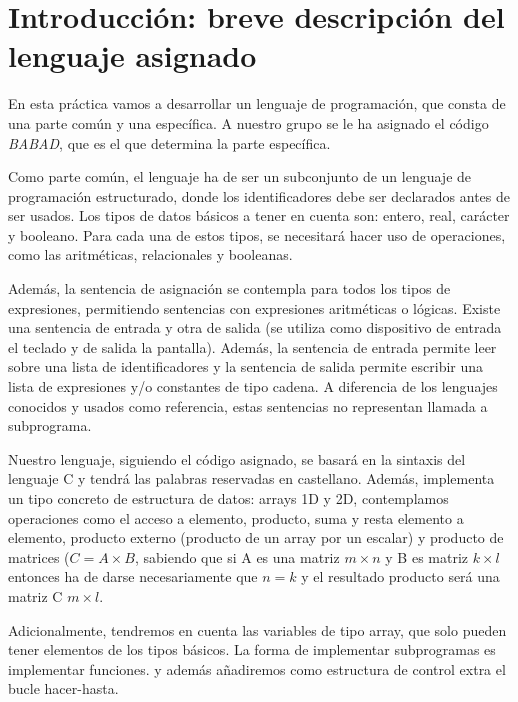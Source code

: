 \section{Introducción: breve descripción del lenguaje asignado}

En esta práctica vamos a desarrollar un lenguaje de programación,
que consta de una parte común y una específica. A nuestro grupo se le ha
asignado el código \emph{BABAD}, que es el que determina la parte específica.

Como parte común, el lenguaje ha de ser un subconjunto de un lenguaje de
programación estructurado, donde los identificadores debe ser declarados antes
de ser usados. Los tipos de datos básicos a tener en cuenta son: entero, real,
carácter y booleano. Para cada una de estos tipos, se necesitará hacer uso de
operaciones, como las aritméticas, relacionales y booleanas.

Además, la sentencia de asignación se contempla para todos los tipos
de expresiones, permitiendo sentencias con expresiones aritméticas o lógicas.
Existe una sentencia de entrada y otra de salida (se utiliza como dispositivo
de entrada el teclado y de salida la pantalla). Además, la sentencia de entrada
permite leer sobre una lista de identificadores y la sentencia de salida permite
escribir una lista de expresiones y/o constantes de tipo cadena. A diferencia
de los lenguajes conocidos y usados como referencia, estas sentencias no
representan llamada a subprograma.

Nuestro lenguaje, siguiendo el código asignado, se basará en la sintaxis del
lenguaje C y tendrá las palabras reservadas en castellano. Además,
implementa un tipo concreto de estructura de datos: arrays 1D y 2D,
contemplamos operaciones como el acceso a elemento, producto, suma y resta
elemento a elemento, producto externo (producto de un array por un escalar)
y producto de matrices ($C = A \times B$, sabiendo que si A es una matriz
$m \times n$ y B es matriz $k \times l$ entonces ha de darse necesariamente que
$n = k$ y el resultado producto será una matriz C $m \times l$.

Adicionalmente, tendremos en cuenta las variables de tipo array, que solo
pueden tener elementos de los tipos básicos. La forma de implementar
subprogramas es implementar funciones. y además añadiremos como estructura de
control extra el bucle hacer-hasta.
